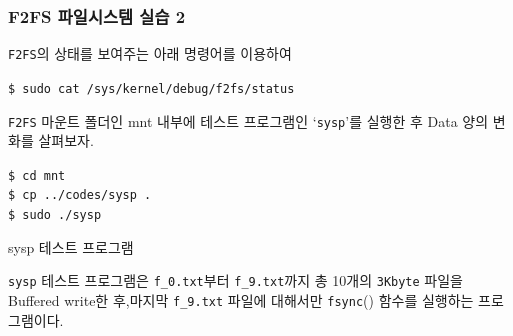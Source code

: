 \documentclass[newPxFont,sthlmFooter,nooffset]{beamer}
\begin{document}
\begin{frame}[containsverbatim,t]
  \frametitle{F2FS 파일시스템 실습 2}
\texttt{F2FS}의 상태를 보여주는 아래 명령어를 이용하여 
\begin{mdframed}[backgroundcolor=lightgray,hidealllines=true]
\texttt{\textcolor[rgb]{0,0,0}{\$ sudo cat /sys/kernel/debug/f2fs/status}}
\end{mdframed}
\bigskip
\texttt{F2FS} 마운트 폴더인 mnt 내부에 테스트 프로그램인 `\texttt{sysp}'를 실행한 후 Data 양의 변화를 살펴보자. 
\begin{mdframed}[backgroundcolor=lightgray,hidealllines=true]
\texttt{\textcolor[rgb]{0,0,0}{\$ cd mnt\\
\$ cp ../codes/sysp .\\
\$ sudo ./sysp}}
\end{mdframed}
\begin{footnotesize}
\medskip
\begin{block}{
\begin{scriptsize}
sysp 테스트 프로그램
\end{scriptsize}
}\medskip
\texttt{sysp} 테스트 프로그램은 \texttt{f\_0.txt}부터 \texttt{f\_9.txt}까지 총 10개의 \texttt{3Kbyte} 파일을 Buffered write한 후,마지막 \texttt{f\_9.txt} 파일에 대해서만 \texttt{fsync}() 함수를 실행하는 프로그램이다. 
\end{block}
\end{footnotesize}
\end{frame}
\end{document}

